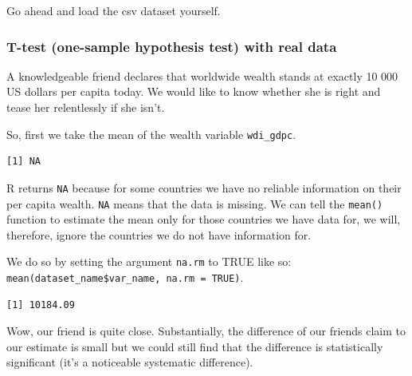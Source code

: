 \documentclass[]{article}
\newenvironment{Shaded}{\begin{snugshade}}{\end{snugshade}}
\newcommand{\DataTypeTok}[1]{\textcolor[rgb]{0.13,0.29,0.53}{#1}}
\newcommand{\KeywordTok}[1]{\textcolor[rgb]{0.13,0.29,0.53}{\textbf{#1}}}
\newcommand{\NormalTok}[1]{#1}
\newcommand{\OperatorTok}[1]{\textcolor[rgb]{0.81,0.36,0.00}{\textbf{#1}}}
\newcommand{\OtherTok}[1]{\textcolor[rgb]{0.56,0.35,0.01}{#1}}
\newcommand{\StringTok}[1]{\textcolor[rgb]{0.31,0.60,0.02}{#1}}
\begin{document}
Go ahead and load the csv dataset yourself.

\hypertarget{t-test-one-sample-hypothesis-test-with-real-data}{%
\subsubsection{T-test (one-sample hypothesis test) with real data}\label{t-test-one-sample-hypothesis-test-with-real-data}}

A knowledgeable friend declares that worldwide wealth stands at exactly 10 000 US dollars per capita today. We would like to know whether she is right and tease her relentlessly if she isn't.

So, first we take the mean of the wealth variable \texttt{wdi\_gdpc}.

\begin{Shaded}
\end{Shaded}

\begin{verbatim}
[1] NA
\end{verbatim}

R returns \texttt{NA} because for some countries we have no reliable information on their per capita wealth. \texttt{NA} means that the data is missing. We can tell the \texttt{mean()} function to estimate the mean only for those countries we have data for, we will, therefore, ignore the countries we do not have information for.

We do so by setting the argument \texttt{na.rm} to TRUE like so: \texttt{mean(dataset\_name\$var\_name,\ na.rm\ =\ TRUE)}.

\begin{Shaded}
\end{Shaded}

\begin{verbatim}
[1] 10184.09
\end{verbatim}

Wow, our friend is quite close. Substantially, the difference of our friends claim to our estimate is small but we could still find that the difference is statistically significant (it's a noticeable systematic difference).
\end{document}
